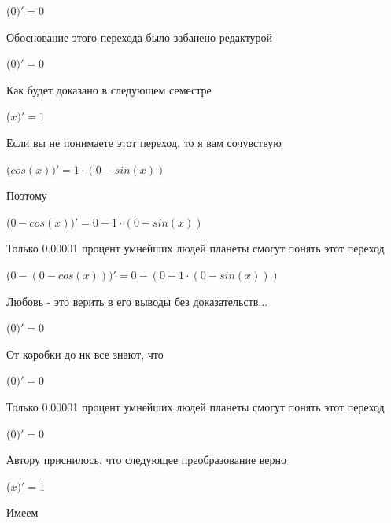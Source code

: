 \documentclass[12pt,a4paper,fleqn]{article}
\begin{document}
\begin{center}
\begin{center}
\begin{center}
\begin{center}
\begin{center}
\begin{center}
\begin{center}
\begin{center}
\begin{center}
\begin{center}
\begin{center}
\begin{center}
\begin{center}
\begin{center}
\begin{center}
\begin{center}
\begin{center}
\begin{center}
\begin{center}
\begin{center}
\begin{center}
\begin{center}
\begin{center}
\begin{center}
\begin{center}
\begin{center}
\begin{center}
\begin{center}
\begin{center}
\begin{center}
\begin{center}
\begin{center}
\begin{center}
\begin{center}
\begin{center}
\begin{center}
\begin{center}
\begin{center}
\begin{center}
\begin{center}
\begin{center}
\begin{center}
\begin{center}
\begin{center}
\begin{center}
 ($0)'
  = 0$\end{center}
Обоснование этого перехода было забанено редактурой

\begin{center}
 ($0)'
  = 0$\end{center}
Как будет доказано в следующем семестре

\begin{center}
 ($x)'
  = 1$\end{center}
Если вы не понимаете этот переход, то я вам сочувствую

\begin{center}
 ($cos(x))'
  = 1 \cdot (0-sin(x))$\end{center}
Поэтому

\begin{center}
 ($0-cos(x))'
  = 0-1 \cdot (0-sin(x))$\end{center}
Только 0.00001 процент умнейших людей планеты смогут понять этот переход

\begin{center}
 ($0-(0-cos(x)))'
  = 0-(0-1 \cdot (0-sin(x)))$\end{center}
Любовь - это верить в его выводы без доказательств...

\begin{center}
 ($0)'
  = 0$\end{center}
От коробки до нк все знают, что

\begin{center}
 ($0)'
  = 0$\end{center}
Только 0.00001 процент умнейших людей планеты смогут понять этот переход

\begin{center}
 ($0)'
  = 0$\end{center}
Автору приснилось, что следующее преобразование верно

\begin{center}
 ($x)'
  = 1$\end{center}
Имеем


\end{center}
\end{center}
\end{center}
\end{center}
\end{center}
\end{center}
\end{center}
\end{center}
\end{center}
\end{center}
\end{center}
\end{center}
\end{center}
\end{center}
\end{center}
\end{center}
\end{center}
\end{center}
\end{center}
\end{center}
\end{center}
\end{center}
\end{center}
\end{center}
\end{center}
\end{center}
\end{center}
\end{center}
\end{center}
\end{center}
\end{center}
\end{center}
\end{center}
\end{center}
\end{center}
\end{center}
\end{center}
\end{center}
\end{center}
\end{center}
\end{center}
\end{center}
\end{center}
\end{center}
\end{document}
